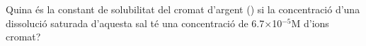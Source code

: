 \begin{exr}{}
Quina és la constant de solubilitat del cromat d'argent () si la concentració d'una dissolució saturada d'aquesta sal té una concentració de 6.7$\times$10$^{-5}$M d'ions cromat?
\end{exr}
